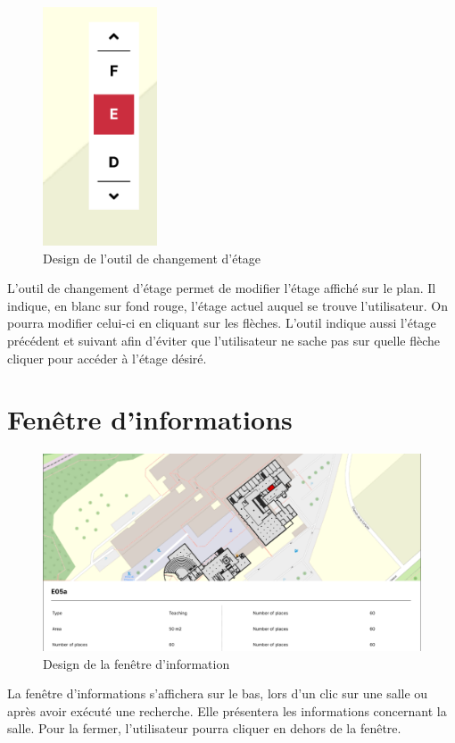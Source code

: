 \documentclass[
    iai, %
    il, %
]{heig-tb}
\begin{document}
\begin{figure}[H]
    \caption{Design de l'outil de changement d'étage}
    \centering
    \includegraphics[scale=1]{designChangementEtage.png}
\end{figure}

L'outil de changement d'étage permet de modifier l'étage affiché sur le plan.
Il indique, en blanc sur fond rouge, l'étage actuel auquel se trouve l'utilisateur.
On pourra modifier celui-ci en cliquant sur les flèches.
L'outil indique aussi l'étage précédent et suivant
afin d'éviter que l'utilisateur ne sache pas sur quelle flèche cliquer pour accéder à l'étage désiré.

\section{Fenêtre d'informations}

\begin{figure}[H]
    \caption{Design de la fenêtre d'information}
    \centering
    \includegraphics[scale=0.4]{designInfo.png}
\end{figure}

La fenêtre d'informations s'affichera sur le bas, lors d'un clic sur une salle ou après avoir exécuté une recherche.
Elle présentera les informations concernant la salle.
Pour la fermer, l'utilisateur pourra cliquer en dehors de la fenêtre.
\end{document}
